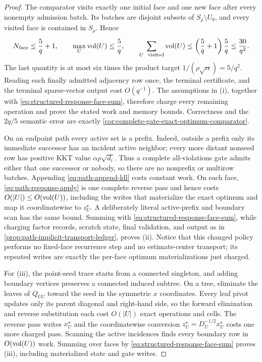 \begin{proof}
The comparator visits exactly one initial face and one new face after every
nonempty admission batch.  Its batches are disjoint subsets of
$S_\rho\setminus U_0$, and every visited face is contained in $S_\rho$.
Hence
\begin{equation}
 N_{\rm face}\leq\frac5q+1,
 \qquad
 \max_U\operatorname{vol}(U)\leq\frac5q,
 \qquad
 \sum_{U\ \text{ visited}}\operatorname{vol}(U)
 \leq\left(\frac5q+1\right)\frac5q
 \leq\frac{30}{q^2}.
 \label{eq:structured-response-face-sum}
\end{equation}
The last quantity is at most six times the product target
$1/(\rho\sqrt\alpha)=5/q^2$.  Reading each finally admitted adjacency row
once, the terminal certificate, and the terminal sparse-vector output cost
$O(q^{-1})$.  The assumptions in (i), together with
\cref{eq:structured-response-face-sum}, therefore charge every remaining
operation and prove the stated work and memory bounds.  Correctness and the
$2q/5$ semantic error are exactly
\cref{cor:complete-gate-exact-optimum-comparator}.

On an endpoint path every active set is a prefix.  Indeed, outside a prefix
only its immediate successor has an incident active neighbor; every more
distant nonseed row has positive KKT value $\alpha\rho\sqrt{d_i}$.  Thus a
complete all-violations gate admits either that one successor or nobody, so
there are no nonprefix or multirow batches.  Appending
\cref{eq:path-append-ldl} costs constant work.  On each face,
\cref{eq:path-response-apply} is one complete reverse pass and hence costs
$O(|U|)\leq O(\operatorname{vol}(U))$, including the writes that materialize
the exact optimum and map it coordinatewise to $z_U^\star$.  A deliberately
literal active-prefix and boundary scan has the
same bound.  Summing with \cref{eq:structured-response-face-sum}, while
charging factor records, scratch state, final validation, and output as in
\cref{prop:path-implicit-transport-ledger}, proves (ii).  Notice that this
changed policy performs no fixed-face recurrence step and no estimate-center
transport; its repeated writes are exactly the per-face optimum
materializations just charged.

For (iii), the point-seed trace starts from a connected singleton, and adding
boundary vertices preserves a connected induced subtree.  On a tree,
eliminate the leaves of $Q_{UU}$ toward the seed in the symmetric $x$
coordinates.  Every leaf pivot updates
only its parent diagonal and right-hand side, so the forward elimination and
reverse substitution each cost $O(|U|)$ exact operations and cells.  The
reverse pass writes $x_U^\star$ and the coordinatewise conversion
$z_U^\star=D_U^{-1/2}x_U^\star$ costs one more charged pass.  Scanning the active incidences
finds every boundary row in $O(\operatorname{vol}(U))$ work.  Summing over faces by
\cref{eq:structured-response-face-sum} proves (iii), including materialized
state and gate writes.


\end{proof}
